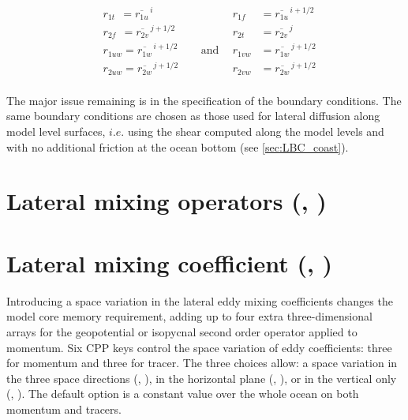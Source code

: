 \documentclass[../tex_main/NEMO_manual]{subfiles}
\begin{document}
\begin{equation} \label{eq:ldfslp_dyn}
\begin{aligned}
&r_{1t}\ \ = \overline{r_{1u}}^{\,i}       &&&    r_{1f}\ \ &= \overline{r_{1u}}^{\,i+1/2} \\
&r_{2f} \ \ = \overline{r_{2v}}^{\,j+1/2} &&& 	r_{2t}\ &= \overline{r_{2v}}^{\,j} \\
&r_{1uw}  = \overline{r_{1w}}^{\,i+1/2} &&\ \ \text{and} \ \ &   r_{1vw}&= \overline{r_{1w}}^{\,j+1/2} \\
&r_{2uw}= \overline{r_{2w}}^{\,j+1/2} &&&         r_{2vw}&= \overline{r_{2w}}^{\,j+1/2}\\
\end{aligned}
\end{equation}

The major issue remaining is in the specification of the boundary conditions.
The same boundary conditions are chosen as those used for lateral diffusion along model level surfaces,
$i.e.$ using the shear computed along the model levels and with no additional friction at the ocean bottom
(see \autoref{sec:LBC_coast}).


\section{Lateral mixing operators (\protect{}, \protect{}) }
\label{sec:LDF_op}


   
\section{Lateral mixing coefficient (\protect{}, \protect{}) }
\label{sec:LDF_coef}

Introducing a space variation in the lateral eddy mixing coefficients changes the model core memory requirement,
adding up to four extra three-dimensional arrays for the geopotential or isopycnal second order operator applied to 
momentum.
Six CPP keys control the space variation of eddy coefficients: three for momentum and three for tracer.
The three choices allow:
a space variation in the three space directions (,  ),
in the horizontal plane (,  ),
or in the vertical only (,  ).
The default option is a constant value over the whole ocean on both momentum and tracers. 
   
\end{document}
